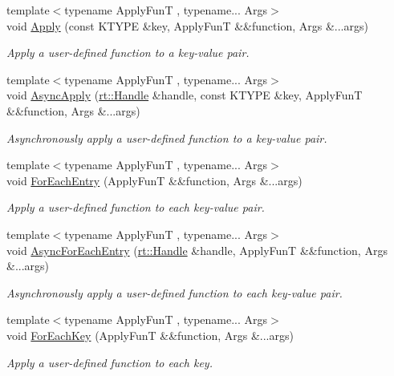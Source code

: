 \begin{DoxyCompactItemize}
{\footnotesize template$<$typename Apply\-Fun\-T , typename... Args$>$ }\\void \hyperlink{classshad_1_1Hashmap_ad8cca9577908ecd19463eb6e89d1df8e}{Apply} (const K\-T\-Y\-P\-E \&key, Apply\-Fun\-T \&\&function, Args \&...args)
\begin{DoxyCompactList}\small\item\em Apply a user-\/defined function to a key-\/value pair. \end{DoxyCompactList}\item 
{\footnotesize template$<$typename Apply\-Fun\-T , typename... Args$>$ }\\void \hyperlink{classshad_1_1Hashmap_aa2e494d7ecb711f9e8a1f077fa0aba6d}{Async\-Apply} (\hyperlink{classshad_1_1rt_1_1Handle}{rt\-::\-Handle} \&handle, const K\-T\-Y\-P\-E \&key, Apply\-Fun\-T \&\&function, Args \&...args)
\begin{DoxyCompactList}\small\item\em Asynchronously apply a user-\/defined function to a key-\/value pair. \end{DoxyCompactList}\item 
{\footnotesize template$<$typename Apply\-Fun\-T , typename... Args$>$ }\\void \hyperlink{classshad_1_1Hashmap_a8013caa5b8fd66516bcf24d2eabf5f61}{For\-Each\-Entry} (Apply\-Fun\-T \&\&function, Args \&...args)
\begin{DoxyCompactList}\small\item\em Apply a user-\/defined function to each key-\/value pair. \end{DoxyCompactList}\item 
{\footnotesize template$<$typename Apply\-Fun\-T , typename... Args$>$ }\\void \hyperlink{classshad_1_1Hashmap_a041eacf973eaadac4a710997ec22cb48}{Async\-For\-Each\-Entry} (\hyperlink{classshad_1_1rt_1_1Handle}{rt\-::\-Handle} \&handle, Apply\-Fun\-T \&\&function, Args \&...args)
\begin{DoxyCompactList}\small\item\em Asynchronously apply a user-\/defined function to each key-\/value pair. \end{DoxyCompactList}\item 
{\footnotesize template$<$typename Apply\-Fun\-T , typename... Args$>$ }\\void \hyperlink{classshad_1_1Hashmap_afd8abe4f63a6570b29578dae3b449249}{For\-Each\-Key} (Apply\-Fun\-T \&\&function, Args \&...args)
\begin{DoxyCompactList}\small\item\em Apply a user-\/defined function to each key. \end{DoxyCompactList}\item 

\end{DoxyCompactItemize}
